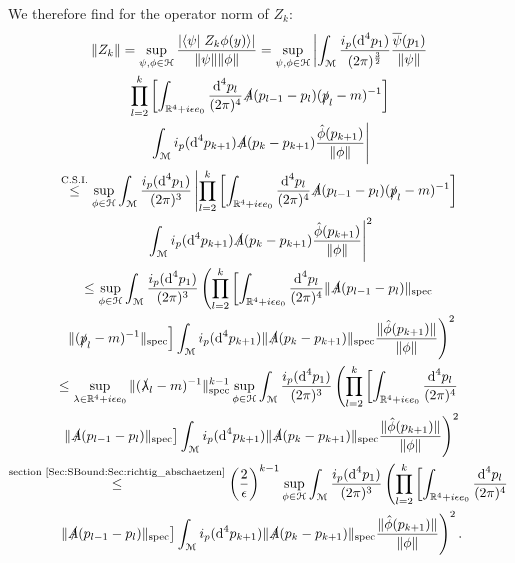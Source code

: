 \documentclass[b5paper,draft,openbib,12pt]{memoir}
\newcommand{\letext}[1]{\ensuremath{\stackrel{\text{#1}}{\le}}}
\begin{document}
We therefore find for the operator norm of \(Z_k\):
\begin{multline}\label{Z_k estimate}
\|Z_k\|=\sup_{\psi,\phi \in \mathcal{H}}\frac{\left|\left<\psi\right| \left. Z_k\phi(y)\right>\right|}{\|\psi\| \|\phi\|}
=\sup_{\psi,\phi \in \mathcal{H}}\left|\int_{\mathcal{M}}\frac{i_p(\text{d}^4p_1)}{(2\pi)^{\frac{3}{2}}}\frac{\overline{\psi}(p_1)}{\|\psi\|}\right. \\
\left. \prod_{l=2}^{k} \left[ \int_{\mathbb{R}^4+i \epsilon e_0}\frac{\text{d}^4p_l}{(2\pi)^{4}} \slashed{A}(p_{l-1}-p_l)  (\slashed{p}_l-m)^{-1}  
 \right]\right.\\
 \left. \int_{\mathcal{M}}  i_p(\text{d}^4p_{k+1})\slashed{A}(p_{k}-p_{k+1})\frac{\hat{\phi}(p_{k+1})}{\|\phi\|}\right|\\
\letext{C.S.I.} \sup_{\phi\in\mathcal{H}}\int_{\mathcal{M}}\frac{i_p(\text{d}^4p_1)}{(2\pi)^{3}}
  \left|\prod_{l=2}^{k} \left[ \int_{\mathbb{R}^4+i \epsilon e_0}\frac{\text{d}^4p_l}{(2\pi)^{4}} \slashed{A}(p_{l-1}-p_l)  (\slashed{p}_l-m)^{-1}  
 \right]\right.\\
\left. \int_{\mathcal{M}}  i_p(\text{d}^4p_{k+1})\slashed{A}(p_{k}-p_{k+1})\frac{\hat{\phi}(p_{k+1})}{\|\phi\|}\right|^2\\
 \le \sup_{\phi\in\mathcal{H}}\int_{\mathcal{M}}\frac{i_p(\text{d}^4p_1)}{(2\pi)^{3}}
  \left(\prod_{l=2}^{k} \left[ \int_{\mathbb{R}^4+i \epsilon e_0}\frac{\text{d}^4p_l}{(2\pi)^{4}} \|\slashed{A}(p_{l-1}-p_l)\|_{\text{spec}}\right.\right.\\
  \left.\left. \| (\slashed{p}_l-m)^{-1}\|_{\text{spec}} \right]
 \int_{\mathcal{M}}  i_p(\text{d}^4p_{k+1})\|\slashed{A}(p_{k}-p_{k+1})\|_{\text{spec}}\frac{\|\hat{\phi}(p_{k+1})\|}{\|\phi\|}\right)^2\\
 \le \sup_{\lambda\in\mathbb{R}^4+i \epsilon e_0}\| (\slashed{\lambda}_l-m)^{-1}\|_{\text{spec}}^{k-1}   \sup_{\phi\in\mathcal{H}}\int_{\mathcal{M}}\frac{i_p(\text{d}^4p_1)}{(2\pi)^{3}}
  \left(\prod_{l=2}^{k} \left[ \int_{\mathbb{R}^4+i \epsilon e_0}\frac{\text{d}^4p_l}{(2\pi)^{4}}\right.\right.\\
  \left.\left. \|\slashed{A}(p_{l-1}-p_l)\|_{\text{spec}}  \right]
 \int_{\mathcal{M}}  i_p(\text{d}^4p_{k+1})\|\slashed{A}(p_{k}-p_{k+1})\|_{\text{spec}}\frac{\|\hat{\phi}(p_{k+1})\|}{\|\phi\|}\right)^2\\
 \letext{section \ref{Sec:SBound:Sec:richtig_abschaetzen}} \left(\frac{2}{\epsilon}\right)^{k-1}   \sup_{\phi\in\mathcal{H}}\int_{\mathcal{M}}\frac{i_p(\text{d}^4p_1)}{(2\pi)^{3}}
  \left(\prod_{l=2}^{k} \left[ \int_{\mathbb{R}^4+i \epsilon e_0}\frac{\text{d}^4p_l}{(2\pi)^{4}}\right.\right.\\
\left.\left.   \|\slashed{A}(p_{l-1}-p_l)\|_{\text{spec}}  \right]
 \int_{\mathcal{M}}  i_p(\text{d}^4p_{k+1})\|\slashed{A}(p_{k}-p_{k+1})\|_{\text{spec}}\frac{\|\hat{\phi}(p_{k+1})\|}{\|\phi\|}\right)^2.
 \end{multline}
\end{document}
